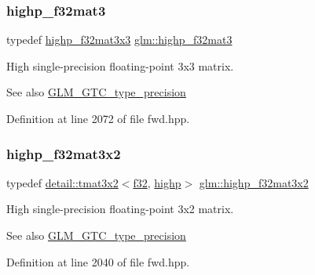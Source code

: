 \subsubsection{\texorpdfstring{highp\+\_\+f32mat3}{highp\_f32mat3}}
{\footnotesize\ttfamily typedef \hyperlink{group__gtc__type__precision_ga334eca23d23aef90972fb20c5b749ca3}{highp\+\_\+f32mat3x3} \hyperlink{group__gtc__type__precision_ga06809818db73785334f839742a9ad85a}{glm\+::highp\+\_\+f32mat3}}

High single-\/precision floating-\/point 3x3 matrix. \begin{DoxySeeAlso}{See also}
\hyperlink{group__gtc__type__precision}{G\+L\+M\+\_\+\+G\+T\+C\+\_\+type\+\_\+precision} 
\end{DoxySeeAlso}


Definition at line 2072 of file fwd.\+hpp.

\mbox{\label{group__gtc__type__precision_gaf36b2b34ea881977c61491b0d3b25a28}} 
\subsubsection{\texorpdfstring{highp\+\_\+f32mat3x2}{highp\_f32mat3x2}}
{\footnotesize\ttfamily typedef \hyperlink{structglm_1_1detail_1_1tmat3x2}{detail\+::tmat3x2}$<$\hyperlink{group__gtc__type__precision_ga0ec999b57f5330d9021256e96038df04}{f32}, \hyperlink{namespaceglm_a0f04f086094c747d227af4425893f545ac6f7eab42eacbb10d59a58e95e362074}{highp}$>$ \hyperlink{group__gtc__type__precision_gaf36b2b34ea881977c61491b0d3b25a28}{glm\+::highp\+\_\+f32mat3x2}}

High single-\/precision floating-\/point 3x2 matrix. \begin{DoxySeeAlso}{See also}
\hyperlink{group__gtc__type__precision}{G\+L\+M\+\_\+\+G\+T\+C\+\_\+type\+\_\+precision} 
\end{DoxySeeAlso}


Definition at line 2040 of file fwd.\+hpp.

\mbox{\label{group__gtc__type__precision_ga334eca23d23aef90972fb20c5b749ca3}} 
